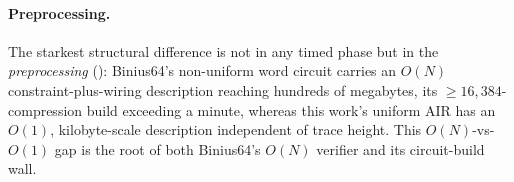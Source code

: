 \paragraph{Preprocessing.} The starkest structural difference is not in any timed
phase but in the \emph{preprocessing} (): Binius64's
non-uniform word circuit carries an $O(N)$ constraint-plus-wiring description
reaching hundreds of megabytes, its $\ge 16{,}384$-compression build exceeding a
minute, whereas this work's uniform AIR has an $O(1)$, kilobyte-scale description
independent of trace height. This $O(N)$-vs-$O(1)$ gap is the root of both
Binius64's $O(N)$ verifier and its circuit-build wall.
